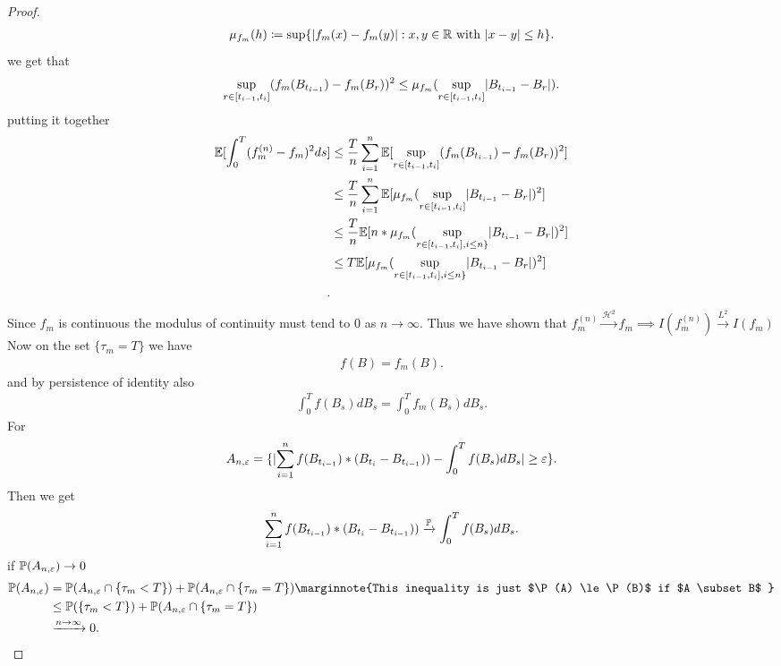 \begin{proof}
\begin{align*}
  \mu_{f_m}(h)\coloneqq  \sup \{\abs{f_m(x)-f_m(y)} : x,y \in  \mathbb{R} \text{ with } \abs{x-y} \le h \}
.\end{align*}
we get that
\begin{align*}
  \sup_{r \in [t_{i-1},t_{i}]}(f_m(B_{t_{i-1}})-f_m(B_r))^2  \le \mu_{f_m}(\sup_{r \in [t_{i-1},t_i]} \abs{B_{t_{i-1}}-B_r})  
.\end{align*}
putting it together
\begin{align*}
  \E[\int_0^{T}  (f_m^{(n)} - f_m )^2 ds] &\le    \frac{T}{n} \sum_{i=1}^{n} \E[\sup_{r \in [t_{i-1},t_{i}]}(f_m(B_{t_{i-1}})-f_m(B_r))^2 ] \\
                                          &\le  \frac{T}{n} \sum_{i=1}^{n} \E[ \mu_{f_m}(\sup_{r \in [t_{i-1},t_i]} \abs{B_{t_{i-1}}-B_r})^2] \\
                                          &\le  \frac{T}{n} \E[n* \mu_{f_m}(\sup_{r \in [t_{i-1},t_i],i\le n\}  } \abs{B_{t_{i-1}}-B_r})^2] \\
                                          &\le  T \E[\mu_{f_m}(\sup_{r \in [t_{i-1},t_i],i\le n\}  } \abs{B_{t_{i-1}}-B_r})^2] \\
.\end{align*}
Since $f_m$ is continuous the modulus of continuity must tend to 0 as $n\to \infty$.
Thus we have shown that $f_m^{(n)} \xrightarrow{\mathcal{H}^2} f_m  \implies I(f_m^{(n)} ) \xrightarrow{L^2} I(f_m)$\\
Now on the set $\{\tau_m = T\}  $ we have 
\begin{align*}
  f(B) = f_m(B) 
.\end{align*}
and  by persistence of identity also 
\begin{align*}
  \int_0^{T} f(B_s) dB_s = \int_0^{T}   f_m(B_s) dB_s
.\end{align*}
For 
\begin{align*}
  A_{n,\epsilon } = \{\abs{\sum_{i=1}^{n} f(B_{t_{i-1}})*(B_{t_i}-B_{t_{i-1}}))  - \int_0^{T} f(B_s) dB_s } \ge  \epsilon\}  
.\end{align*}
Then we get 
\begin{align*}
\sum_{i=1}^{n} f(B_{t_{i-1}})*(B_{t_i}-B_{t_{i-1}}))  \xrightarrow{\P} \int_0^{T} f(B_s) dB_s 
.\end{align*}
if $\P(A_{n,\epsilon}) \to 0$ 
\begin{align*}
  \P(A_{n,\epsilon}) &= \P(A_{n,\epsilon} \cap \{\tau_m < T\} ) + \P(A_{n,\epsilon} \cap \{\tau_m = T\} ) \marginnote{This inequality is just $\P(A) \le  \P(B)$ if $A \subset B$ } \\
                     &\le  \P(\{\tau_m < T\} ) + \P(A_{n,\epsilon} \cap \{\tau_m = T\} ) \\ 
                     &\xrightarrow{n\to \infty} 0 
.\end{align*}
\end{proof}
